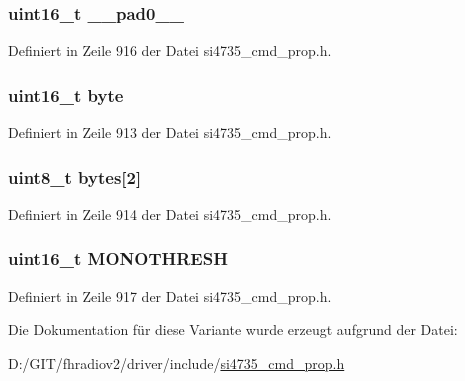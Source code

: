 \subsubsection[{\+\_\+\+\_\+pad0\+\_\+\+\_\+}]{\setlength{\rightskip}{0pt plus 5cm}uint16\+\_\+t \+\_\+\+\_\+pad0\+\_\+\+\_\+}\label{unionfm__blend__multi__mono__thres_a77132c2c26a75f5b8751b235cda23828}


Definiert in Zeile 916 der Datei si4735\+\_\+cmd\+\_\+prop.\+h.

\hypertarget{unionfm__blend__multi__mono__thres_ab0549c1b5ea980a02e7eab77e21fea49}{}
\subsubsection[{byte}]{\setlength{\rightskip}{0pt plus 5cm}uint16\+\_\+t byte}\label{unionfm__blend__multi__mono__thres_ab0549c1b5ea980a02e7eab77e21fea49}


Definiert in Zeile 913 der Datei si4735\+\_\+cmd\+\_\+prop.\+h.

\hypertarget{unionfm__blend__multi__mono__thres_a46e4c05d20a047ec169f60d3167e912e}{}
\subsubsection[{bytes}]{\setlength{\rightskip}{0pt plus 5cm}uint8\+\_\+t bytes\mbox{[}2\mbox{]}}\label{unionfm__blend__multi__mono__thres_a46e4c05d20a047ec169f60d3167e912e}


Definiert in Zeile 914 der Datei si4735\+\_\+cmd\+\_\+prop.\+h.

\hypertarget{unionfm__blend__multi__mono__thres_a5de7498b6512934529d0c6284f120805}{}
\subsubsection[{M\+O\+N\+O\+T\+H\+R\+E\+S\+H}]{\setlength{\rightskip}{0pt plus 5cm}uint16\+\_\+t M\+O\+N\+O\+T\+H\+R\+E\+S\+H}\label{unionfm__blend__multi__mono__thres_a5de7498b6512934529d0c6284f120805}


Definiert in Zeile 917 der Datei si4735\+\_\+cmd\+\_\+prop.\+h.



Die Dokumentation für diese Variante wurde erzeugt aufgrund der Datei\+:\begin{DoxyCompactItemize}
\item 
D\+:/\+G\+I\+T/fhradiov2/driver/include/\hyperlink{si4735__cmd__prop_8h}{si4735\+\_\+cmd\+\_\+prop.\+h}\end{DoxyCompactItemize}
